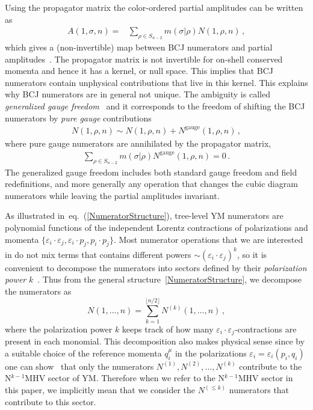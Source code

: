 \documentclass[11pt,a4paper]{article}
\def\eqn#1{eq.~(\ref{#1})}
\begin{document}
Using the propagator matrix the color-ordered partial amplitudes can be written as
\begin{align} \label{eq:BAampli}
A(1,\sigma,n) =& \sum_{\rho \in S_{n-2}} m(\sigma | \rho) N(1,\rho,n)\,,
\end{align} 
which gives a (non-invertible) map between BCJ numerators and partial amplitudes~\cite{Bern:2008qj}.
The propagator matrix is not invertible for on-shell conserved momenta and hence it has a kernel, or null space. This implies that BCJ numerators contain unphysical contributions that live in this kernel. This explains why BCJ numerators are in general not unique.  The ambiguity is called \emph{generalized gauge freedom}~\cite{Bern:2008qj,Bern:2010ue} and it corresponds to the freedom of shifting the BCJ numerators by \emph{pure gauge} contributions
\begin{align}\label{eq:DefinePureGauge}
N(1,\rho ,n)\sim N(1,\rho ,n)+N^{\text{gauge}}(1,\rho ,n)\,,
\end{align} 
where pure gauge numerators are annihilated by the propagator matrix,
\begin{align}
\sum_{\rho\in S_{n-2}}m(\sigma|\rho)N^{\text{gauge}}(1,\rho,n)=0\,. 
\end{align} 
The generalized gauge freedom includes both standard gauge freedom and field redefinitions, and more generally any operation that changes the cubic diagram numerators while leaving the partial amplitudes invariant. 

As illustrated in~\eqn{NumeratorStructure}, tree-level YM numerators are polynomial functions of the independent Lorentz contractions of polarizations and momenta $\{\varepsilon_i\cdot\varepsilon_j,\varepsilon_i\cdot p_j,p_i\cdot p_j\}$. Most numerator operations that we are interested in do not mix terms that contains different powers $\sim (\varepsilon_i\cdot\varepsilon_j)^k$, so it is convenient to decompose the numerators into sectors defined by their {\it polarization power} $k$~\cite{Chen:2019ywi}. Thus from the general structure~\eqref{NumeratorStructure}, we decompose the numerators as 
\begin{equation}
N(1,\ldots, n) = \sum_{k=1}^{\lfloor n/2 \rfloor} N^{(k)}(1,\ldots, n) \, ,
\end{equation}
where the polarization power $k$ keeps track of how many $\varepsilon_i {\cdot}\varepsilon_j$-contractions are present in each monomial. This decomposition also makes physical sense since by a suitable choice of the reference momenta $q_i^\mu$ in the polarizations $\varepsilon_i=\varepsilon_i(p_i,q_i)$ one can show~\cite{Chen:2019ywi} that only the numerators $N^{(1)},N^{(2)},\ldots, N^{(k)}$ contribute to the N${}^{k-1}$MHV sector of YM. Therefore when we refer to the N${}^{k-1}$MHV sector in this paper, we implicitly mean that we consider the $N^{(\le k)}$ numerators that contribute to this sector.  
\end{document}
